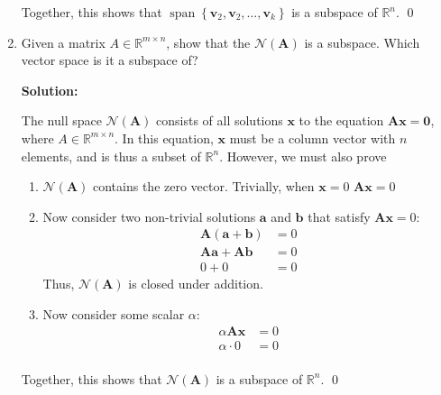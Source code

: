 \begin{enumerate}[label=(\alph*)]
	      \par Together, this shows that $\operatorname{span}\left\{\mathbf{v}_{2},
		      \mathbf{v}_{2}, \ldots, \mathbf{v}_{k}\right\}$ is a subspace of
	      $\mathbb{R}^n$. \qed

	\item Given a matrix $A \in \mathbb{R}^{m \times n}$, show that the
	      $\mathcal{N}(\mathbf{A})$ is a subspace. Which vector space is it a
	      subspace of?

	      \par \textbf{Solution:}
	      \par The null space $\mathcal{N}(\mathbf{A})$ consists of all solutions $\mathbf{x}$
	      to the equation $\mathbf{A}\mathbf{x} = \mathbf{0}$, where $A \in
		      \mathbb{R}^{m \times n}$. In this equation, $\mathbf{x}$ must be a
	      column vector with $n$ elements, and is thus a subset of
	      $\mathbb{R}^n$. However, we must also prove

	      \begin{enumerate}[label=\roman*.]
		      \item $\mathcal{N}(\mathbf{A})$ contains the zero vector.
		            Trivially, when $\mathbf{x} = 0$
		            $\mathbf{Ax} = 0$
		      \item Now consider two non-trivial solutions $\mathbf{a}$ and
		            $\mathbf{b}$ that satisfy $\mathbf{Ax} = 0$:
		            $$
			            \begin{aligned}
				            \mathbf{A}(\mathbf{a} + \mathbf{b}) & = 0 \\
				            \mathbf{Aa} + \mathbf{Ab}           & = 0 \\
				            0 + 0                               & = 0
			            \end{aligned}
		            $$
		            Thus, $\mathcal{N}(\mathbf{A})$ is closed under addition.
		      \item Now consider some scalar $\alpha$:
		            $$
			            \begin{aligned}
				            \alpha\mathbf{Ax} & = 0 \\
				            \alpha \cdot 0    & = 0 \\
			            \end{aligned}
		            $$
	      \end{enumerate}
	      Together, this shows that $\mathcal{N}(\mathbf{A})$ is a subspace of
	      $\mathbb{R}^n$. \qed
\end{enumerate}
